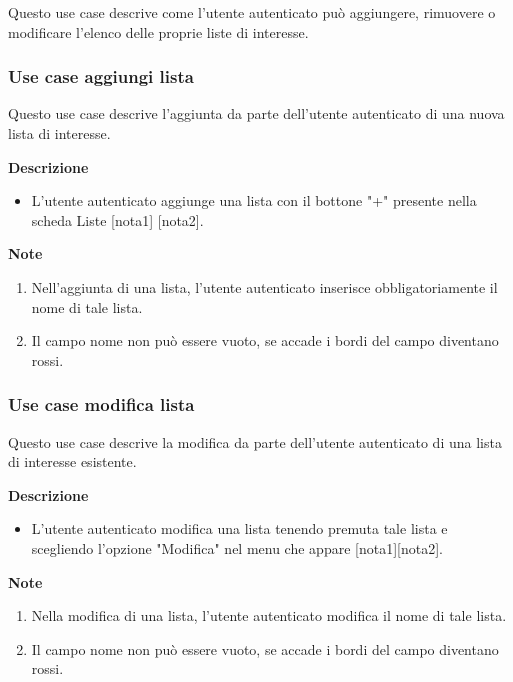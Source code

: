 \documentclass[a4paper,12pt]{article}
\begin{document}
Questo use case descrive come l'utente autenticato può aggiungere, rimuovere o modificare l'elenco delle proprie liste di interesse.


\subsubsection*{Use case aggiungi lista}

Questo use case descrive l'aggiunta da parte dell'utente autenticato di una nuova lista di interesse.

\textbf{Descrizione}
\begin{itemize} \setlength\itemsep{0.01em}
\item L'utente autenticato aggiunge una lista con il bottone "+" presente nella scheda Liste [nota1] [nota2].
\end{itemize}

\textbf{Note}
\begin{enumerate} \setlength\itemsep{0.01em}
\item Nell'aggiunta di una lista, l'utente autenticato inserisce obbligatoriamente il nome di tale lista.
\item Il campo nome non può essere vuoto, se accade i bordi del campo diventano rossi.
\end{enumerate}


\subsubsection*{Use case modifica lista}

Questo use case descrive la modifica da parte dell'utente autenticato di una lista di interesse esistente.

\textbf{Descrizione}
\begin{itemize} \setlength\itemsep{0.01em}
\item L'utente autenticato modifica una lista tenendo premuta tale lista e scegliendo l'opzione "Modifica" nel menu che appare [nota1][nota2].
\end{itemize}

\textbf{Note}
\begin{enumerate} \setlength\itemsep{0.01em}
\item Nella modifica di una lista, l'utente autenticato modifica il nome di tale lista.
\item Il campo nome non può essere vuoto, se accade i bordi del campo diventano rossi.
\end{enumerate}
\end{document}
